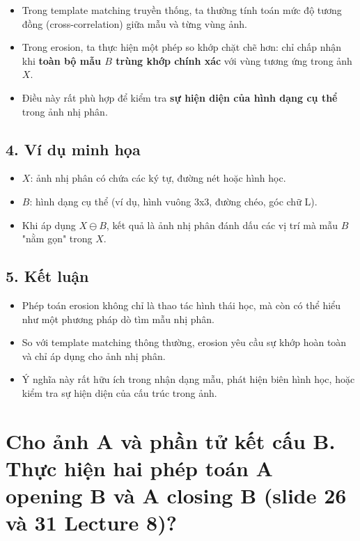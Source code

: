 \documentclass[12pt]{article}
\begin{document}
	 \begin{itemize}
	 \item Trong template matching truyền thống, ta thường tính toán mức độ tương đồng (cross-correlation) giữa mẫu và từng vùng ảnh.
	 \item Trong erosion, ta thực hiện một phép so khớp chặt chẽ hơn: chỉ chấp nhận khi \textbf{toàn bộ mẫu $B$ trùng khớp chính xác} với vùng tương ứng trong ảnh $X$.
	 \item Điều này rất phù hợp để kiểm tra \textbf{sự hiện diện của hình dạng cụ thể} trong ảnh nhị phân.
	 \end{itemize}
	 
	 \subsection*{4. Ví dụ minh họa}
	 
	 \begin{itemize}
	 \item $X$: ảnh nhị phân có chứa các ký tự, đường nét hoặc hình học.
	 \item $B$: hình dạng cụ thể (ví dụ, hình vuông 3x3, đường chéo, góc chữ L).
	 \item Khi áp dụng $X \ominus B$, kết quả là ảnh nhị phân đánh dấu các vị trí mà mẫu $B$ "nằm gọn" trong $X$.
	 \end{itemize}
	 
	 \subsection*{5. Kết luận}
	 
	 \begin{itemize}
	 \item Phép toán erosion không chỉ là thao tác hình thái học, mà còn có thể hiểu như một phương pháp dò tìm mẫu nhị phân.
	 \item So với template matching thông thường, erosion yêu cầu sự khớp hoàn toàn và chỉ áp dụng cho ảnh nhị phân.
	 \item Ý nghĩa này rất hữu ích trong nhận dạng mẫu, phát hiện biên hình học, hoặc kiểm tra sự hiện diện của cấu trúc trong ảnh.
	 \end{itemize}
	 
	 \section{Cho ảnh A và phần tử kết cấu B. Thực hiện hai phép toán A opening B và A closing B (slide 26 và 31 Lecture 8)?}
	 
\end{document}
